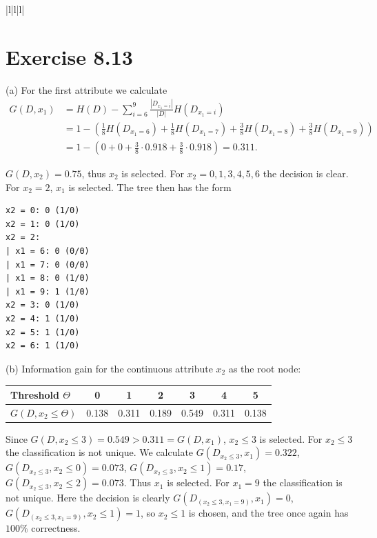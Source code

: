 \documentclass[10pt]{book}
\begin{document}
\begin{center}
\begin{tabular}{|l|l|l|}
\section{Exercise 8.13}
(a) For the first attribute we calculate
\[
\begin{aligned}
G\left(D, x_{1}\right) & = H(D) - \sum_{i=6}^{9} \frac{\left|D_{x_{1}=i}\right|}{|D|} H\left(D_{x_{1}=i}\right) \\
&= 1-\left(\frac{1}{8} H\left(D_{x_{1}=6}\right)+\frac{1}{8} H\left(D_{x_{1}=7}\right)+\frac{3}{8} H\left(D_{x_{1}=8}\right)+\frac{3}{8} H\left(D_{x_{1}=9}\right)\right) \\
&= 1-\left(0+0+\frac{3}{8} \cdot 0.918+\frac{3}{8} \cdot 0.918\right)=0.311.
\end{aligned}
\]

$G\left(D, x_{2}\right)=0.75$, thus $x_{2}$ is selected. For $x_{2}=0,1,3,4,5,6$ the decision is clear. For $x_{2}=2$, $x_{1}$ is selected. The tree then has the form

\begin{verbatim}
x2 = 0: 0 (1/0)
x2 = 1: 0 (1/0)
x2 = 2:
| x1 = 6: 0 (0/0)
| x1 = 7: 0 (0/0)
| x1 = 8: 0 (1/0)
| x1 = 9: 1 (1/0)
x2 = 3: 0 (1/0)
x2 = 4: 1 (1/0)
x2 = 5: 1 (1/0)
x2 = 6: 1 (1/0)
\end{verbatim}

(b) Information gain for the continuous attribute $x_{2}$ as the root node:

\begin{center}
\begin{tabular}{lcccccc}
\hline
Threshold $\Theta$ & 0 & 1 & 2 & 3 & 4 & 5 \\
\hline
$G\left(D, x_{2} \leq \Theta\right)$ & 0.138 & 0.311 & 0.189 & 0.549 & 0.311 & 0.138 \\
\hline
\end{tabular}
\end{center}

Since $G\left(D, x_{2} \leq 3\right)=0.549>0.311=G\left(D, x_{1}\right)$, $x_{2} \leq 3$ is selected. For $x_{2} \leq 3$ the classification is not unique. We calculate $G\left(D_{x_{2} \leq 3}, x_{1}\right)=0.322$, $G\left(D_{x_{2} \leq 3}, x_{2} \leq 0\right)=0.073$, $G\left(D_{x_{2} \leq 3}, x_{2} \leq 1\right)=0.17$, $G\left(D_{x_{2} \leq 3}, x_{2} \leq 2\right)=0.073$. Thus $x_{1}$ is selected. For $x_{1}=9$ the classification is not unique. Here the decision is clearly $G\left(D_{\left(x_{2} \leq 3, x_{1}=9\right)}, x_{1}\right)=0$, $G\left(D_{\left(x_{2} \leq 3, x_{1}=9\right)}, x_{2} \leq 1\right)=1$, so $x_{2} \leq 1$ is chosen, and the tree once again has $100\%$ correctness.


\end{tabular}
\end{center}
\end{document}
